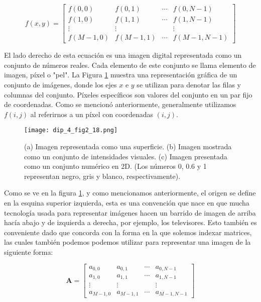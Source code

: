 $$
f(x, y)=\left[\begin{array}{cccc}
f(0,0) & f(0,1) & \cdots & f(0, N-1) \\
f(1,0) & f(1,1) & \cdots & f(1, N-1) \\
\vdots & \vdots & & \vdots \\
f(M-1,0) & f(M-1,1) & \cdots & f(M-1, N-1)
\end{array}\right]
$$

El lado derecho de esta ecuación es una imagen digital representada como un conjunto de números reales. Cada elemento de este conjunto se llama elemento de imagen, píxel o "pel". La Figura \ref{fig:dip_2_18} muestra una representación gráfica de un conjunto de imágenes, donde los ejes $x$ e $y$ se utilizan para denotar las filas y columnas del conjunto. Píxeles específicos son valores del conjunto en un par fijo de coordenadas. Como se mencionó anteriormente, generalmente utilizamos $f(i, j)$ al referirnos a un píxel con coordenadas $(i, j)$.


\begin{figure}[H]
    \centering
    \texttt{[image: dip\_4\_fig2\_18.png]}
    \caption{
        (a) Imagen representada como una superficie.
        (b) Imagen mostrada como un conjunto de intensidades visuales.
        (c) Imagen presentada como un conjunto numérico en 2D. (Los números 0, 0.6 y 1 representan negro, gris y blanco, respectivamente).}
    \label{fig:dip_2_18}
\end{figure}

Como se ve en la figura \ref{fig:dip_2_18}, y como mencionamos anteriormente, el origen se define en la esquina superior izquierda, esta es una convenci\'on que nace en que mucha tecnolog\'ia usada para representar im\'agenes hacen un barrido de imagen de arriba hacía abajo y de izquierda a derecha, por ejemplo, los televisores. Esto tambi\'en es conveniente dado que concorda con la forma en la que solemos indexar matrices, las cuales tambi\'en podemos podemos utilizar para representar una imagen  de la siguiente forma:

$$
\mathbf{A}=\left[\begin{array}{cccc}
a_{0,0} & a_{0,1} & \cdots & a_{0, N-1} \\
a_{1,0} & a_{1,1} & \cdots & a_{1, N-1} \\
\vdots & \vdots & & \vdots \\
a_{M-1,0} & a_{M-1,1} & \cdots & a_{M-1, N-1}
\end{array}\right]
$$

